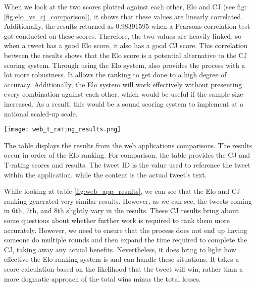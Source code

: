 	When we look at the two scores plotted against each other, Elo and CJ (see fig: \ref{fig:elo_vs_cj_comparison}), it shows that these values are linearly correlated. Additionally, the results returned as 0.98391595 when a Pearsons correlation test got conducted on these scores. Therefore, the two values are heavily linked, so when a tweet has a good Elo score, it also has a good CJ score. This correlation between the results shows that the Elo score is a potential alternative to the CJ scoring system. Through using the Elo system, also provides the process with a lot more robustness. It allows the ranking to get done to a high degree of accuracy. Additionally, the Elo system will work effectively without presenting every combination against each other, which would be useful if the sample size increased. As a result, this would be a sound scoring system to implement at a national scaled-up scale.


	\begin{table}[h]
		\centering
		\texttt{[image: web\_t\_rating\_results.png]}
		\caption{The table displays the results from the web applications comparisons. The results occur in order of the Elo ranking. For comparison, the table provides the CJ and T-rating scores and results. The tweet ID is the value used to reference the tweet within the application, while the content is the actual tweet's text.}
		\label{fig:web_app_results}
		
	\end{table}
	
	
	While looking at table \ref{fig:web_app_results}, we can see that the Elo and CJ ranking generated very similar results. However, as we can see, the tweets coming in 6th, 7th, and 8th slightly vary in the results. These CJ results bring about some questions about whether further work is required to rank them more accurately. However, we need to ensure that the process does not end up having someone do multiple rounds and then expand the time required to complete the CJ, taking away any actual benefits. Nevertheless, it does bring to light how effective the Elo ranking system is and can handle these situations. It takes a score calculation based on the likelihood that the tweet will win, rather than a more dogmatic approach of the total wins minus the total losses.
	
